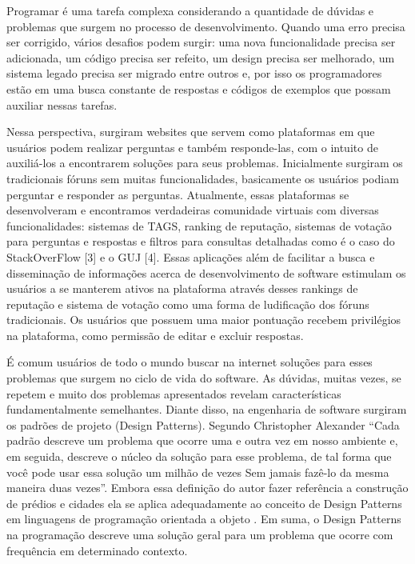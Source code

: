 Programar é uma tarefa complexa considerando a quantidade de dúvidas e problemas que surgem no processo de desenvolvimento. 
Quando uma erro precisa ser corrigido,  vários desafios podem surgir: uma nova funcionalidade precisa ser adicionada, um código precisa 
ser refeito, um design precisa ser melhorado, um sistema legado precisa ser migrado entre outros e, por isso os programadores estão em 
uma busca constante de respostas e códigos de exemplos que possam auxiliar nessas tarefas.

Nessa perspectiva, surgiram websites que servem como plataformas em que usuários podem realizar perguntas e também responde-las, 
com o intuito de auxiliá-los a encontrarem soluções para seus problemas. Inicialmente surgiram os tradicionais fóruns sem muitas  funcionalidades,
 basicamente os usuários podiam perguntar e responder as perguntas. Atualmente, essas plataformas se desenvolveram e encontramos verdadeiras
comunidade virtuais com diversas funcionalidades: sistemas de TAGS, ranking de reputação, sistemas de votação para perguntas e respostas e  
filtros para consultas detalhadas como é o caso do StackOverFlow [3] e o GUJ [4]. Essas aplicações além de facilitar a busca e disseminação 
de informações acerca de desenvolvimento de software estimulam os usuários a se manterem ativos na plataforma através desses rankings 
de reputação e sistema de votação como uma forma de ludificação dos fóruns tradicionais. Os usuários que possuem uma maior pontuação
recebem privilégios na plataforma, como permissão de editar e excluir respostas.

É comum usuários de todo o mundo buscar na internet soluções para esses problemas que surgem no ciclo de vida do software. As dúvidas,
muitas vezes, se repetem e muito dos problemas apresentados revelam  características fundamentalmente semelhantes. Diante disso, na engenharia
 de software surgiram os padrões de projeto (Design Patterns). Segundo Christopher Alexander “Cada padrão descreve um problema que ocorre uma 
e outra vez em nosso ambiente e, em seguida, descreve o núcleo da solução para esse problema, de tal forma que você pode usar essa solução um milhão
de vezes Sem jamais fazê-lo da mesma maneira duas vezes”\cite{gamma1995design}. Embora essa definição do autor fazer referência a construção 
de prédios e cidades ela se aplica adequadamente ao conceito de Design Patterns em linguagens de programação orientada a objeto \cite{alexander1977pattern}. 
Em suma, o Design Patterns na programação descreve uma solução geral para um problema que ocorre com frequência em determinado contexto.

